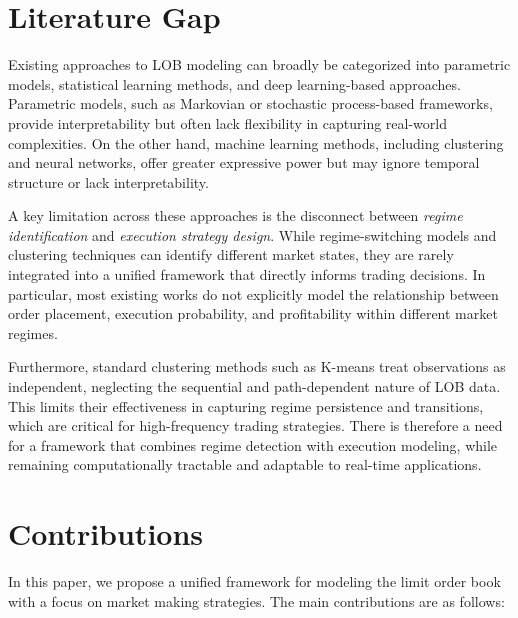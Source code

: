 \documentclass[12pt,a4paper]{report}
\begin{document}
\section{Literature Gap}

Existing approaches to LOB modeling can broadly be categorized into parametric models, statistical learning methods, and deep learning-based approaches. Parametric models, such as Markovian or stochastic process-based frameworks, provide interpretability but often lack flexibility in capturing real-world complexities. On the other hand, machine learning methods, including clustering and neural networks, offer greater expressive power but may ignore temporal structure or lack interpretability.

A key limitation across these approaches is the disconnect between \textit{regime identification} and \textit{execution strategy design}. While regime-switching models and clustering techniques can identify different market states, they are rarely integrated into a unified framework that directly informs trading decisions. In particular, most existing works do not explicitly model the relationship between order placement, execution probability, and profitability within different market regimes.

Furthermore, standard clustering methods such as K-means treat observations as independent, neglecting the sequential and path-dependent nature of LOB data. This limits their effectiveness in capturing regime persistence and transitions, which are critical for high-frequency trading strategies. There is therefore a need for a framework that combines regime detection with execution modeling, while remaining computationally tractable and adaptable to real-time applications.

\section{Contributions}

In this paper, we propose a unified framework for modeling the limit order book with a focus on market making strategies. The main contributions are as follows:
\end{document}
